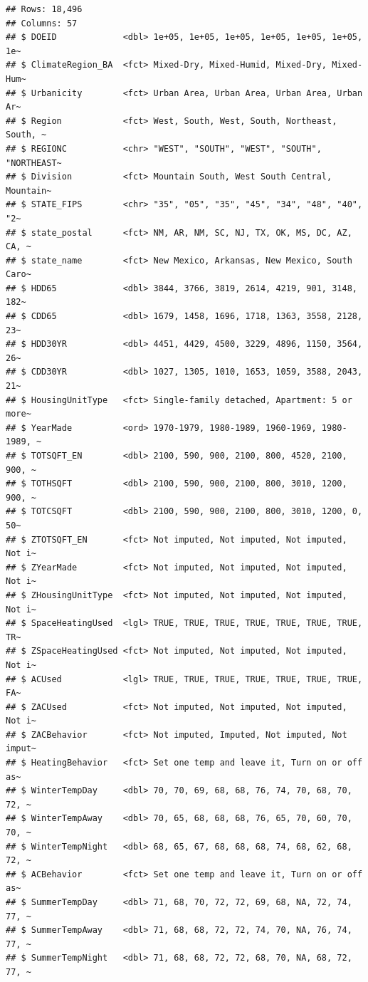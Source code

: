 \documentclass[
]{krantz}
\begin{document}
\begin{verbatim}
## Rows: 18,496
## Columns: 57
## $ DOEID             <dbl> 1e+05, 1e+05, 1e+05, 1e+05, 1e+05, 1e+05, 1e~
## $ ClimateRegion_BA  <fct> Mixed-Dry, Mixed-Humid, Mixed-Dry, Mixed-Hum~
## $ Urbanicity        <fct> Urban Area, Urban Area, Urban Area, Urban Ar~
## $ Region            <fct> West, South, West, South, Northeast, South, ~
## $ REGIONC           <chr> "WEST", "SOUTH", "WEST", "SOUTH", "NORTHEAST~
## $ Division          <fct> Mountain South, West South Central, Mountain~
## $ STATE_FIPS        <chr> "35", "05", "35", "45", "34", "48", "40", "2~
## $ state_postal      <fct> NM, AR, NM, SC, NJ, TX, OK, MS, DC, AZ, CA, ~
## $ state_name        <fct> New Mexico, Arkansas, New Mexico, South Caro~
## $ HDD65             <dbl> 3844, 3766, 3819, 2614, 4219, 901, 3148, 182~
## $ CDD65             <dbl> 1679, 1458, 1696, 1718, 1363, 3558, 2128, 23~
## $ HDD30YR           <dbl> 4451, 4429, 4500, 3229, 4896, 1150, 3564, 26~
## $ CDD30YR           <dbl> 1027, 1305, 1010, 1653, 1059, 3588, 2043, 21~
## $ HousingUnitType   <fct> Single-family detached, Apartment: 5 or more~
## $ YearMade          <ord> 1970-1979, 1980-1989, 1960-1969, 1980-1989, ~
## $ TOTSQFT_EN        <dbl> 2100, 590, 900, 2100, 800, 4520, 2100, 900, ~
## $ TOTHSQFT          <dbl> 2100, 590, 900, 2100, 800, 3010, 1200, 900, ~
## $ TOTCSQFT          <dbl> 2100, 590, 900, 2100, 800, 3010, 1200, 0, 50~
## $ ZTOTSQFT_EN       <fct> Not imputed, Not imputed, Not imputed, Not i~
## $ ZYearMade         <fct> Not imputed, Not imputed, Not imputed, Not i~
## $ ZHousingUnitType  <fct> Not imputed, Not imputed, Not imputed, Not i~
## $ SpaceHeatingUsed  <lgl> TRUE, TRUE, TRUE, TRUE, TRUE, TRUE, TRUE, TR~
## $ ZSpaceHeatingUsed <fct> Not imputed, Not imputed, Not imputed, Not i~
## $ ACUsed            <lgl> TRUE, TRUE, TRUE, TRUE, TRUE, TRUE, TRUE, FA~
## $ ZACUsed           <fct> Not imputed, Not imputed, Not imputed, Not i~
## $ ZACBehavior       <fct> Not imputed, Imputed, Not imputed, Not imput~
## $ HeatingBehavior   <fct> Set one temp and leave it, Turn on or off as~
## $ WinterTempDay     <dbl> 70, 70, 69, 68, 68, 76, 74, 70, 68, 70, 72, ~
## $ WinterTempAway    <dbl> 70, 65, 68, 68, 68, 76, 65, 70, 60, 70, 70, ~
## $ WinterTempNight   <dbl> 68, 65, 67, 68, 68, 68, 74, 68, 62, 68, 72, ~
## $ ACBehavior        <fct> Set one temp and leave it, Turn on or off as~
## $ SummerTempDay     <dbl> 71, 68, 70, 72, 72, 69, 68, NA, 72, 74, 77, ~
## $ SummerTempAway    <dbl> 71, 68, 68, 72, 72, 74, 70, NA, 76, 74, 77, ~
## $ SummerTempNight   <dbl> 71, 68, 68, 72, 72, 68, 70, NA, 68, 72, 77, ~

\end{verbatim}
\end{document}
